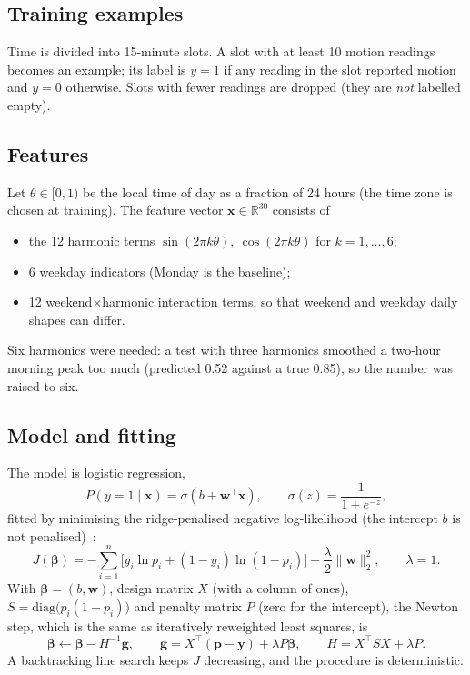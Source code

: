 \documentclass[12pt,a4paper,oneside]{report}
\begin{document}
\subsection{Training examples}
Time is divided into 15-minute slots. A slot with at least 10 motion readings becomes an example; its label is $y=1$ if any reading in the slot reported motion and $y=0$ otherwise. Slots with fewer readings are dropped (they are \emph{not} labelled empty).

\subsection{Features}
Let $\theta\in[0,1)$ be the local time of day as a fraction of 24 hours (the time zone is chosen at training). The feature vector $\mathbf{x}\in\mathbb{R}^{30}$ consists of
\begin{itemize}
  \item the 12 harmonic terms $\sin(2\pi k\theta),\ \cos(2\pi k\theta)$ for $k=1,\dots,6$;
  \item 6 weekday indicators (Monday is the baseline);
  \item 12 weekend$\times$harmonic interaction terms, so that weekend and weekday daily shapes can differ.
\end{itemize}
Six harmonics were needed: a test with three harmonics smoothed a two-hour morning peak too much (predicted 0.52 against a true 0.85), so the number was raised to six.

\subsection{Model and fitting}
The model is logistic regression,
\begin{equation}
  P(y=1\mid\mathbf{x})=\sigma(b+\mathbf{w}^{\top}\mathbf{x}),\qquad \sigma(z)=\frac{1}{1+e^{-z}} ,
\end{equation}
fitted by minimising the ridge-penalised negative log-likelihood (the intercept $b$ is not penalised)~\cite{hastie2009esl}:
\begin{equation}
  J(\boldsymbol\beta)=-\sum_{i=1}^{n}\Big[y_i\ln p_i+(1-y_i)\ln(1-p_i)\Big]+\frac{\lambda}{2}\lVert\mathbf{w}\rVert_2^2 ,\qquad \lambda=1 .
\end{equation}
With $\boldsymbol\beta=(b,\mathbf{w})$, design matrix $X$ (with a column of ones), $S=\mathrm{diag}\big(p_i(1-p_i)\big)$ and penalty matrix $P$ (zero for the intercept), the Newton step, which is the same as iteratively reweighted least squares, is
\begin{equation}
  \boldsymbol\beta\leftarrow\boldsymbol\beta-H^{-1}\mathbf{g},\qquad
  \mathbf{g}=X^{\top}(\mathbf{p}-\mathbf{y})+\lambda P\boldsymbol\beta,\qquad
  H=X^{\top}SX+\lambda P .
\end{equation}
A backtracking line search keeps $J$ decreasing, and the procedure is deterministic.
\end{document}
